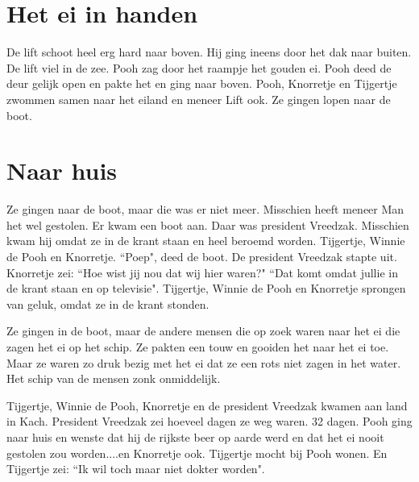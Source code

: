 \documentclass{article}
\begin{document}
\section{Het ei in handen}

De lift schoot heel erg hard naar boven. Hij ging ineens door het dak naar buiten. De lift viel in de zee. Pooh zag door het raampje het gouden ei. Pooh deed de deur gelijk open en pakte het en ging naar boven. Pooh, Knorretje en Tijgertje zwommen samen naar het eiland en meneer Lift ook. Ze gingen lopen naar de boot.

\section{Naar huis}

Ze gingen naar de boot, maar die was er niet meer. Misschien heeft meneer Man het wel gestolen. Er kwam een boot aan. Daar was president Vreedzak. Misschien kwam hij omdat ze in de krant staan en heel beroemd worden. Tijgertje, Winnie de Pooh en Knorretje. ``Poep", deed de boot. De president Vreedzak stapte uit. Knorretje zei: ``Hoe wist jij nou dat wij hier waren?" ``Dat komt omdat jullie in de krant staan en op televisie". Tijgertje, Winnie de Pooh en Knorretje sprongen van geluk, omdat ze in de krant stonden.

Ze gingen in de boot, maar de andere mensen die op zoek waren naar het ei die zagen het ei op het schip. Ze pakten een touw en gooiden het naar het ei toe. Maar ze waren zo druk bezig met het ei dat ze een rots niet zagen in het water. Het schip van de mensen zonk onmiddelijk.

Tijgertje, Winnie de Pooh, Knorretje en de president Vreedzak kwamen aan land in Kach. President Vreedzak zei hoeveel dagen ze weg waren. 32 dagen. Pooh ging naar huis en wenste dat hij de rijkste beer op aarde werd en dat het ei nooit gestolen zou worden....en Knorretje ook. Tijgertje mocht bij Pooh wonen. En Tijgertje zei: ``Ik wil toch maar niet dokter worden".
\end{document}
